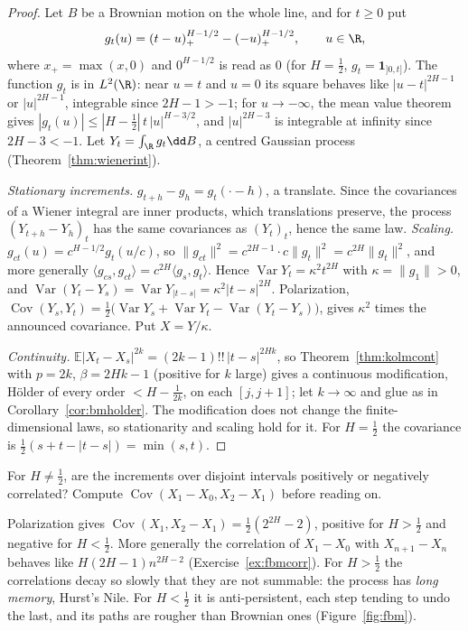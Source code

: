 \begin{proof}
Let $B$ be a Brownian motion on the whole line, and for $t\ge0$ put
\[
g_t(u)=(t-u)_+^{H-1/2}-(-u)_+^{H-1/2},\qquad u\in\R,
\]
where $x_+=\max(x,0)$ and $0^{H-1/2}$ is read as $0$ (for $H=\frac12$, $g_t=\mathbf 1_{]0,t]}$). The function $g_t$ is in $L^2(\R)$: near $u=t$ and $u=0$ its square behaves like $|u-t|^{2H-1}$ or $|u|^{2H-1}$, integrable since
$2H-1>-1$; for $u\to-\infty$, the mean value theorem gives $|g_t(u)|\le|H-\frac12|\,t\,|u|^{H-3/2}$, and $|u|^{2H-3}$ is integrable at infinity since $2H-3<-1$. Let $Y_t=\int_\R g_t\dd B$, a centred Gaussian process
(Theorem~\ref{thm:wienerint}).

\emph{Stationary increments.} $g_{t+h}-g_h=g_t(\cdot-h)$, a translate. Since the covariances of a Wiener integral are inner products, which translations preserve, the process $(Y_{t+h}-Y_h)_t$ has the same covariances as
$(Y_t)_t$, hence the same law. \emph{Scaling.} $g_{ct}(u)=c^{H-1/2}g_t(u/c)$, so $\|g_{ct}\|^2=c^{2H-1}\cdot c\|g_t\|^2=c^{2H}\|g_t\|^2$, and more generally $\langle g_{cs},g_{ct}\rangle=c^{2H}\langle g_s,g_t\rangle$. Hence
$\operatorname{Var}Y_t=\kappa^2t^{2H}$ with $\kappa=\|g_1\|>0$, and $\operatorname{Var}(Y_t-Y_s)=\operatorname{Var}Y_{|t-s|}=\kappa^2|t-s|^{2H}$. Polarization,
$\operatorname{Cov}(Y_s,Y_t)=\frac12\bigl(\operatorname{Var}Y_s+\operatorname{Var}Y_t-\operatorname{Var}(Y_t-Y_s)\bigr)$, gives $\kappa^2$ times the announced covariance. Put $X=Y/\kappa$.

\emph{Continuity.} $\mathbb E|X_t-X_s|^{2k}=(2k-1)!!\,|t-s|^{2Hk}$, so Theorem~\ref{thm:kolmcont} with $p=2k$, $\beta=2Hk-1$ (positive for $k$ large) gives a continuous modification, H\"older of every order
$<H-\frac1{2k}$, on each $[j,j+1]$; let $k\to\infty$ and glue as in Corollary~\ref{cor:bmholder}. The modification does not change the finite-dimensional laws, so stationarity and scaling hold for it. For $H=\frac12$ the
covariance is $\frac12(s+t-|t-s|)=\min(s,t)$.
\end{proof}

\begin{think}
For $H\neq\frac12$, are the increments over disjoint intervals positively or negatively correlated? Compute $\operatorname{Cov}(X_1-X_0,X_2-X_1)$ before reading on.
\end{think}

Polarization gives $\operatorname{Cov}(X_1,X_2-X_1)=\frac12(2^{2H}-2)$, positive for $H>\frac12$ and negative for $H<\frac12$. More generally the correlation of $X_1-X_0$ with $X_{n+1}-X_n$ behaves like
$H(2H-1)n^{2H-2}$ (Exercise~\ref{ex:fbmcorr}). For $H>\frac12$ the correlations decay so slowly that they are not summable: the process has \emph{long memory}, Hurst's Nile. For $H<\frac12$ it is anti-persistent, each
step tending to undo the last, and its paths are rougher than Brownian ones (Figure~\ref{fig:fbm}).

